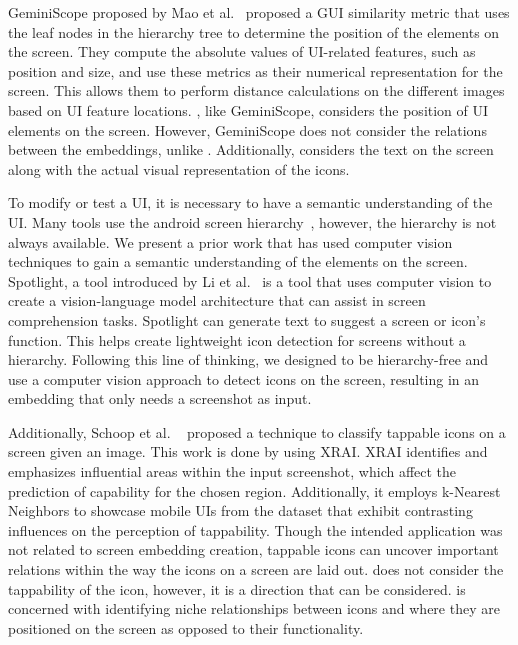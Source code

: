 GeminiScope proposed by Mao et al.~\cite{Mao18} proposed a GUI similarity metric that uses the leaf nodes in the hierarchy tree to determine the position of the elements on the screen. They compute the absolute values of UI-related features,
such as position and size, and use these metrics as their numerical representation for the screen. This allows them to perform distance calculations on the different images based on UI feature locations. \FRAME, like GeminiScope, considers the position of UI elements on the screen. However, GeminiScope does not consider the relations between the embeddings, unlike \FRAME. Additionally, \FRAME considers the text on the screen along with the actual visual representation of the icons. 

To modify or test a UI, it is necessary to have a semantic understanding of the UI. Many tools use the android screen hierarchy~\cite{bai2021uibert,li2021vut, Li21, Schoop22}, however, the hierarchy is not always available. We present a prior work that has used computer vision techniques to gain a semantic understanding of the elements on the screen. 
Spotlight, a tool introduced by Li et al.~\cite{li20spotlight} is a tool that uses computer vision to create a vision-language model architecture that can assist in screen comprehension tasks. Spotlight can generate text to suggest a screen or icon's function. This helps create lightweight icon detection for screens without a hierarchy. Following this line of thinking, we designed \FRAME to be hierarchy-free and use a computer vision approach to detect icons on the screen, resulting in an embedding that only needs a screenshot as input. 

Additionally, Schoop et al. ~\cite{Schoop22} proposed a technique to classify tappable icons on a screen given an image. This work is done by using XRAI. XRAI identifies and emphasizes influential areas within the input screenshot, which affect the prediction of capability for the chosen region. Additionally, it employs k-Nearest Neighbors to showcase mobile UIs from the dataset that exhibit contrasting influences on the perception of tappability. Though the intended application was not related to screen embedding creation, tappable icons can uncover important relations within the way the icons on a screen are laid out. \FRAME does not consider the tappability of the icon, however, it is a direction that can be considered. \FRAME is concerned with identifying niche relationships between icons and where they are positioned on the screen as opposed to their functionality. 

